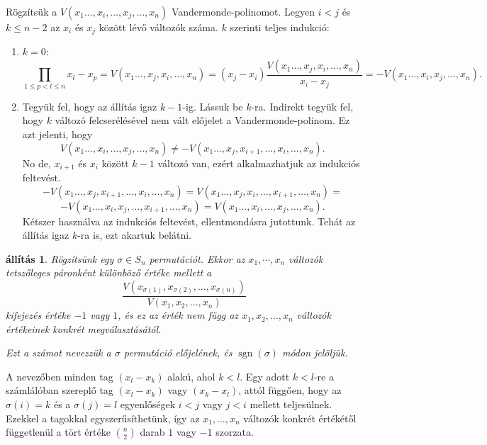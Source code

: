 \documentclass[a4paper, showtrims]{memoir}
\makeatletter
\renewenvironment{proof}[1][\proofname]
    {\par\pushQED{\qed}%
    \normalfont \topsep6\p@\@plus6\p@\relax
    \trivlist
    \item[\hskip\labelsep
        \itshape
    #1\@addpunct{:}]\ignorespaces}
    {\popQED\endtrivlist\@endpefalse}
\theoremstyle{plain}
\newtheorem{proposition}{állítás}[chapter]
\theoremstyle{remark}
\theoremstyle{definition}
\DeclareMathOperator{\sgn}{sgn}
\makeatother
\begin{document}
\begin{proof}
Rögzítsük a $V\left( x_1\ldots,x_i,\ldots,x_j,\ldots,x_n \right)$ Vandermonde-polinomot. Legyen $i<j$ és $k \leq n-2$ az $x_i$ és $x_j$ között lévő változók száma. $k$ szerinti teljes indukció:
\begin{enumerate}
	\item $k = 0$:
\[
	\prod_{1 \leq p<l\leq n}x_l-x_p =V\left( x_1\ldots,x_j ,x_i,\ldots, x_n\right)=(x_j-x_i) \frac {V\left(x_1  \ldots,x_j,x_i,\ldots, x_n \right)}{x_i - x_j} = -V\left(x_1 \ldots,x_i, x_j,\ldots, x_n \right).
\]
	\item Tegyük fel, hogy az állítás igaz $k-1$-ig. Lássuk be $k$-ra. Indirekt tegyük fel, hogy $k$ változó felcserélésével nem vált előjelet a Vandermonde-polinom. Ez azt jelenti, hogy 
\[
V\left(x_1 \ldots,x_i,\ldots,x_j,\ldots, x_n \right) \neq -V\left(x_1 \ldots,x_j, x_{i+1}, \ldots,x_i, \dots,x_n \right).
\]	
No de,  $x_{i+1}$ és $x_i$ között $k-1$ változó van, ezért alkalmazhatjuk az indukciós feltevést.
\[
-V\left(x_1 \ldots,x_j, x_{i+1}, \ldots,x_i, \dots, x_n \right) = V\left(x_1 \ldots,x_j, x_i, \ldots,x_{i+1}, \dots, x_n \right)=
\]
\[
-V\left(x_1 \ldots,x_i, x_j, \ldots,x_{i+1}, \dots, x_n \right)=V\left(x_1 \ldots,x_i,\ldots,x_j,\ldots, x_n \right).
\]
Kétszer használva az indukciós feltevést, ellentmondásra jutottunk. Tehát az állítás igaz $k$-ra is, ezt akartuk belátni.
\end{enumerate}
\end{proof}
\begin{proposition}
    Rögzítsünk egy $\sigma\in S_n$ permutációt. 
    Ekkor az $x_1,\cdots,x_n$ változók tetszőleges páronként különböző értéke mellett a
    \[
        \frac{V\left( x_{\sigma(1)},x_{\sigma(2)},\ldots,x_{\sigma(n)} \right)}{V(x_1,x_2,\ldots,x_n)}
    \]
    kifejezés értéke $-1$ vagy $1$, és ez az érték nem függ az 
    $x_1,x_2,\ldots,x_n$ változók értékeinek konkrét megválasztásától.

    Ezt a számot nevezzük a $\sigma$ permutáció \emph{előjelének}, és $\sgn(\sigma)$ módon jelöljük.
\end{proposition}
    \begin{proof}
        A nevezőben minden tag $\left( x_l-x_k \right)$ alakú, ahol $k<l$. 
        Egy adott $k<l$-re
        a számlálóban szereplő tag $\left( x_l-x_k \right)$ vagy $\left( x_k-x_l \right)$, 
        attól függően, hogy az $\sigma(i)=k$ és a $\sigma(j)=l$ 
        egyenlőségek $i<j$ vagy $j<i$ mellett teljesülnek.
        Ezekkel a tagokkal egyszerűsíthetünk, 
        így az $x_1,\dots,x_n$ változók konkrét értékétől függetlenül a tört értéke $\binom{n}{2}$ darab $1$ vagy $-1$ szorzata.
    \end{proof}
\end{document}
